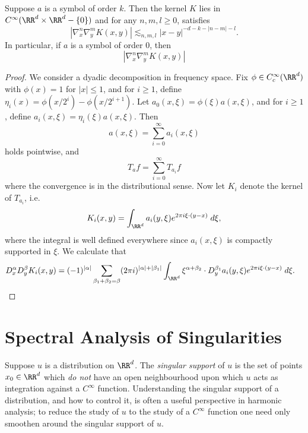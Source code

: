 \begin{theorem}
    Suppose $a$ is a symbol of order $k$. Then the kernel $K$ lies in $C^\infty(\RR^d \times \RR^d - \{ 0 \})$ and for any $n,m,l \geq 0$, satisfies
    \[ |\nabla_x^n \nabla_y^m K(x,y)| \lesssim_{n,m,l} |x-y|^{-d-k-|n-m|-l}. \]
    In particular, if $a$ is a symbol of order $0$, then
    \[ |\nabla_x^n \nabla_y^m K(x,y)| \]
\end{theorem}
\begin{proof}
    We consider a dyadic decomposition in frequency space. Fix $\phi \in C_c^\infty(\RR^d)$ with $\phi(x) = 1$ for $|x| \leq 1$, and for $i \geq 1$, define $\eta_i(x) = \phi(x/2^i) - \phi(x/2^{i+1})$. Let $a_0(x,\xi) = \phi(\xi) a(x,\xi)$, and for $i \geq 1$, define $a_i(x,\xi) = \eta_i(\xi) a(x,\xi)$. Then
    \[ a(x,\xi) = \sum_{i = 0}^\infty a_i(x,\xi) \]
    holds pointwise, and
    \[ T_af = \sum_{i = 0}^\infty T_{a_i} f \]
    where the convergence is in the distributional sense. Now let $K_i$ denote the kernel of $T_{a_i}$, i.e.
    \[ K_i(x,y) = \int_{\RR^d} a_i(y,\xi) e^{2 \pi i \xi \cdot (y - x)}\; d\xi, \]
    where the integral is well defined everywhere since $a_i(x,\xi)$ is compactly supported in $\xi$. We calculate that
    \begin{align*}
        D^\alpha_x D^\beta_y K_i(x,y) &= (-1)^{|\alpha|} \sum_{\beta_1 + \beta_2 = \beta} (2 \pi i)^{|\alpha| + |\beta_1|}  \int_{\RR^d} \xi^{\alpha + \beta_2} \cdot D^{\beta_1}_y a_i(y,\xi) e^{2 \pi i \xi \cdot (y - x)}\; d\xi.
    \end{align*}

\end{proof}
















\chapter{Spectral Analysis of Singularities}

Suppose $u$ is a distribution on $\RR^d$. The \emph{singular support} of $u$ is the set of points $x_0 \in \RR^d$ which \emph{do not} have an open neighbourhood upon which $u$ acts as integration against a $C^\infty$ function. Understanding the singular support of a distribution, and how to control it, is often a useful perspective in harmonic analysis; to reduce the study of $u$ to the study of a $C^\infty$ function one need only smoothen around the singular support of $u$.

